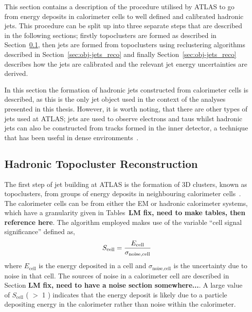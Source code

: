 This section contains a description of the procedure utilised by ATLAS
to go from energy deposits in calorimeter cells to well defined and calibrated hadronic jets.
This procedure can be split up into three separate steps that are described in the following sections;
firstly topoclusters are formed as described in Section~\ref{sec:obj-jets_topo},
then jets are formed from topoclusters using reclustering algorithms described in Section~\ref{sec:obj-jets_reco}
and finally Section~\ref{sec:obj-jets_reco} describes how the jets are calibrated and the relevant jet energy uncertainties are derived.

In this section the formation of hadronic jets constructed from calorimeter cells is described,
as this is the only jet object used in the context of the analyses presented in this thesis.
However, it is worth noting, that there are other types of jets used at ATLAS;
jets are used to observe electrons and taus whilst
hadronic jets can also be constructed from tracks formed in the inner detector, a technique that has been useful in dense environments~\cite{obj-Hbb}.

\subsection{Hadronic Topocluster Reconstruction}
\label{sec:obj-jets_topo}

The first step of jet building at ATLAS is the formation of 3D clusters, known as topoclusters, from groups of energy deposits in neighbouring calorimeter cells~\cite{obj-jets_topo}.
The calorimeter cells can be from either the EM or hadronic calorimeter systems,
which have a granularity given in Tables~\textbf{LM fix, need to make tables, then reference here}.
The algorithm employed makes use of the variable ``cell signal significance'' defined as, 
\begin{equation}
  \Large{S_{\text{cell}} = \frac{E_{\text{cell}}}{\sigma_{\text{noise,cell}}}}
\end{equation}
where $E_{\text{cell}}$ is the energy deposited in a cell
and $\sigma_{\text{noise,cell}}$ is the uncertainty due to noise in that cell.
The sources of noise in a calorimeter cell are described in Section \textbf{LM fix, need to have a noise section somewhere...}.
A large value of $S_{\text{cell}}$ ( $>$ 1 ) indicates that the energy deposit is likely due to a particle
depositing energy in the calorimeter rather than noise within the calorimeter.

